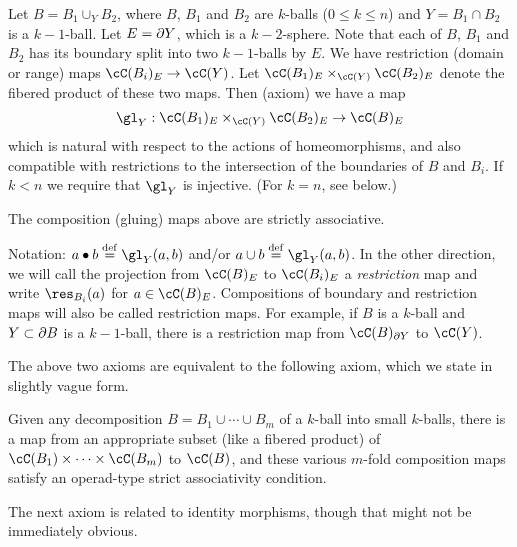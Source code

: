 {Let $B = B_1 \cup_Y B_2$, where $B$, $B_1$ and $B_2$ are $k$-balls ($0\le k\le n$)
and $Y = B_1\cap B_2$ is a $k{-}1$-ball.
Let $E = \partial Y$, which is a $k{-}2$-sphere.
Note that each of $B$, $B_1$ and $B_2$ has its boundary split into two $k{-}1$-balls by $E$.
We have restriction (domain or range) maps $\cC(B_i)_E \to \cC(Y)$.
Let $\cC(B_1)_E \times_{\cC(Y)} \cC(B_2)_E$ denote the fibered product of these two maps. 
Then (axiom) we have a map
\[
	\gl_Y : \cC(B_1)_E \times_{\cC(Y)} \cC(B_2)_E \to \cC(B)_E
\]
which is natural with respect to the actions of homeomorphisms, and also compatible with restrictions
to the intersection of the boundaries of $B$ and $B_i$.
If $k < n$ we require that $\gl_Y$ is injective.
(For $k=n$, see below.)}

{The composition (gluing) maps above are strictly associative.}

Notation: $a\bullet b \deq \gl_Y(a, b)$ and/or $a\cup b \deq \gl_Y(a, b)$.
In the other direction, we will call the projection from $\cC(B)_E$ to $\cC(B_i)_E$ 
a {\it restriction} map and write $\res_{B_i}(a)$ for $a\in \cC(B)_E$.
Compositions of boundary and restriction maps will also be called restriction maps.
For example, if $B$ is a $k$-ball and $Y\subset \partial B$ is a $k{-}1$-ball, there is a
restriction map from $\cC(B)_{\bd Y}$ to $\cC(Y)$.


The above two axioms are equivalent to the following axiom,
which we state in slightly vague form.

{Given any decomposition $B = B_1\cup\cdots\cup B_m$ of a $k$-ball
into small $k$-balls, there is a 
map from an appropriate subset (like a fibered product) 
of $\cC(B_1)\times\cdots\times\cC(B_m)$ to $\cC(B)$,
and these various $m$-fold composition maps satisfy an
operad-type strict associativity condition.}

The next axiom is related to identity morphisms, though that might not be immediately obvious.

